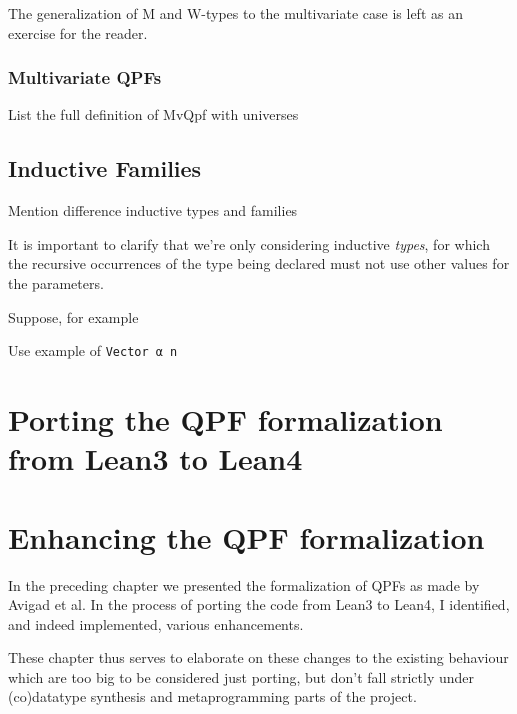 \documentclass[titlepage]{report}
\newenvironment{todo}{\begin{shaded}\begin{trivlist}                         
    \item[\hskip \labelsep {\bfseries Todo:}]}{\end{trivlist}\end{shaded}}
\begin{document}
The generalization of M and W-types to the multivariate case is left as an exercise for the reader.

\subsection{Multivariate QPFs}

\begin{todo}
    List the full definition of MvQpf with universes
\end{todo}


\section{Inductive Families}
\begin{todo}
    Mention difference inductive types and families

    It is important to clarify that we're only considering inductive \emph{types}, 
for which the recursive occurrences of the type being declared must not use other values for the 
parameters.

Suppose, for example 

    Use example of \texttt{Vector α n}
\end{todo}




\chapter{Porting the QPF formalization from Lean3 to Lean4}
\label{ch:porting}








\chapter{Enhancing the QPF formalization}
\label{ch:enhancing}


In the preceding chapter we presented the formalization of QPFs as made by Avigad et al.
In the process of porting the code from Lean3 to Lean4, 
I identified, and indeed implemented, various enhancements. 

These chapter thus serves to elaborate on these changes to the existing behaviour which are too big
to be considered just porting, but don't fall strictly under (co)datatype synthesis and metaprogramming parts of the project.
\end{document}
